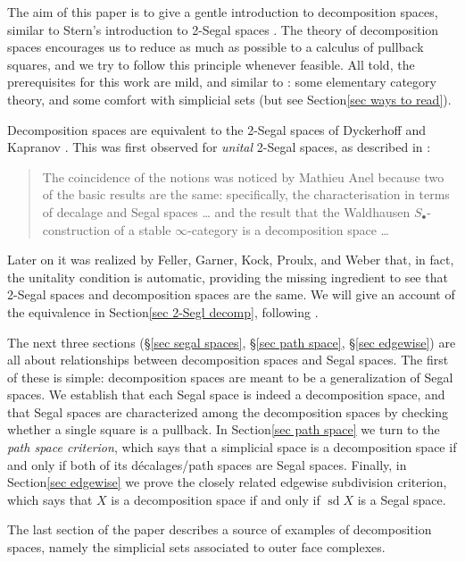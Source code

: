 \documentclass{amsart}
\theoremstyle{definition}
\theoremstyle{remark}
\DeclareMathOperator{\sd}{sd}
\begin{document}
The aim of this paper is to give a gentle introduction to decomposition spaces, similar to Stern's introduction to 2-Segal spaces \cite{Stern:BIRS}.
The theory of decomposition spaces encourages us to reduce as much as possible to a calculus of pullback squares, and we try to follow this principle whenever feasible.
All told, the prerequisites for this work are mild, and similar to \cite{Stern:BIRS}: some elementary category theory, and some comfort with simplicial sets (but see Section\nobreakspace \ref {sec ways to read}).

Decomposition spaces are equivalent to the 2-Segal spaces of Dyckerhoff and Kapranov \cite{DyckerhoffKapranov:HSS}. 
This was first observed for \emph{unital} 2-Segal spaces, as described in \cite[p.~959]{GKT1}:

\begin{quote}
The coincidence of the notions was noticed by Mathieu Anel because two of the basic results are the same: specifically, the characterisation in terms of decalage and Segal spaces \dots{} and the result that the Waldhausen $S_\bullet$-construction of a stable $\infty$-category is a decomposition space \dots{}
\end{quote}
Later on it was realized by Feller, Garner, Kock, Proulx, and Weber \cite{Feller_et_al:E2SSU} that, in fact, the unitality condition is automatic, providing the missing ingredient to see that 2-Segal spaces and decomposition spaces are the same. 
We will give an account of the equivalence in Section\nobreakspace \ref {sec 2-Segl decomp}, following \cite{GKT1,Feller_et_al:E2SSU}.

The next three sections (\S\ref{sec segal spaces}, \S\ref{sec path space}, \S\ref{sec edgewise}) are all about relationships between decomposition spaces and Segal spaces.
The first of these is simple: decomposition spaces are meant to be a generalization of Segal spaces.
We establish that each Segal space is indeed a decomposition space, and that Segal spaces are characterized among the decomposition spaces by checking whether a single square is a pullback.
In Section\nobreakspace \ref {sec path space} we turn to the \emph{path space criterion}, which says that a simplicial space is a decomposition space if and only if both of its d\'ecalages/path spaces are Segal spaces.
Finally, in Section\nobreakspace \ref {sec edgewise} we prove the closely related edgewise subdivision criterion, which says that $X$ is a decomposition space if and only if $\sd X$ is a Segal space.

The last section of the paper describes a source of examples of decomposition spaces, namely the simplicial sets associated to outer face complexes.
\end{document}
